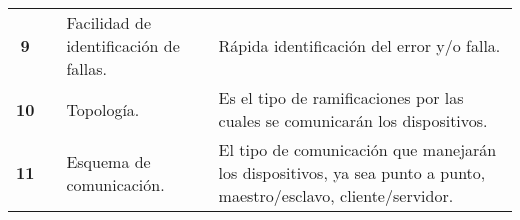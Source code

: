 \begin{table}[H]
\begin{tabular}{|c|c|p{10em}|p{23em}|}
		\cline{1-1}\cline{3-4}    \textbf{ 9} &       &  Facilidad de identificación de fallas. &  Rápida identificación del error y/o falla. \\
		\cline{1-1}\cline{3-4}    \textbf{ 10} &       &  Topología. &  Es el tipo de ramificaciones por las cuales se comunicarán los dispositivos. \\
		\cline{1-1}\cline{3-4}    \textbf{ 11} &       &  Esquema de comunicación. &  El tipo de comunicación que manejarán los dispositivos, ya sea punto a punto, maestro/esclavo, cliente/servidor. \\
		\hline	
	\end{tabular}%
	\label{tab:addlabel1}%
\end{table}%

\newpage

